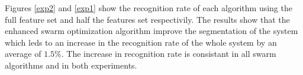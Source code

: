 \documentclass[10pt]{article}
\begin{document}
Figures \ref{exp2} and \ref{exp1} show the recognition rate of each algorithm using the full feature set and half the features set respectivily. The results show that the enhanced swarm optimization algorithm improve the segmentation of the system which leds to an increase in the recognition rate of the whole system by an average of $1.5\%$.  The increase in recognition rate is consistant in all swarm algorithms and in both experiments.    %
	 

 
\end{document}
